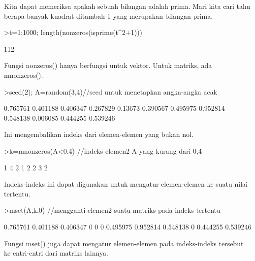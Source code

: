 \documentclass[12pt,arial,letterpaper]{book}
\begin{document}
\begin{eulercomment}
\begin{eulercomment}
\begin{eulercomment}
Kita dapat memeriksa apakah sebuah bilangan adalah prima. Mari kita
cari tahu berapa banyak kuadrat ditambah 1 yang merupakan bilangan
prima.
\end{eulercomment}
\begin{eulerprompt}
>t=1:1000; length(nonzeros(isprime(t^2+1)))
\end{eulerprompt}
\begin{euleroutput}
  112
\end{euleroutput}
\begin{eulercomment}
Fungsi nonzeros() hanya berfungsi untuk vektor. Untuk matriks, ada
mnonzeros().
\end{eulercomment}
\begin{eulerprompt}
>seed(2); A=random(3,4)//seed untuk menetapkan angka-angka acak
\end{eulerprompt}
\begin{euleroutput}
       0.765761      0.401188      0.406347      0.267829 
        0.13673      0.390567      0.495975      0.952814 
       0.548138      0.006085      0.444255      0.539246 
\end{euleroutput}
\begin{eulercomment}
Ini mengembalikan indeks dari elemen-elemen yang bukan nol.
\end{eulercomment}
\begin{eulerprompt}
>k=mnonzeros(A<0.4) //indeks elemen2 A yang kurang dari 0,4
\end{eulerprompt}
\begin{euleroutput}
              1             4 
              2             1 
              2             2 
              3             2 
\end{euleroutput}
\begin{eulercomment}
Indeks-indeks ini dapat digunakan untuk mengatur elemen-elemen ke
suatu nilai tertentu.
\end{eulercomment}
\begin{eulerprompt}
>mset(A,k,0) //mengganti elemen2 suatu matriks pada indeks tertentu
\end{eulerprompt}
\begin{euleroutput}
       0.765761      0.401188      0.406347             0 
              0             0      0.495975      0.952814 
       0.548138             0      0.444255      0.539246 
\end{euleroutput}
\begin{eulercomment}
Fungsi mset() juga dapat mengatur elemen-elemen pada indeks-indeks
tersebut ke entri-entri dari matriks lainnya.

\end{eulercomment}
\end{eulercomment}
\end{eulercomment}
\end{document}
